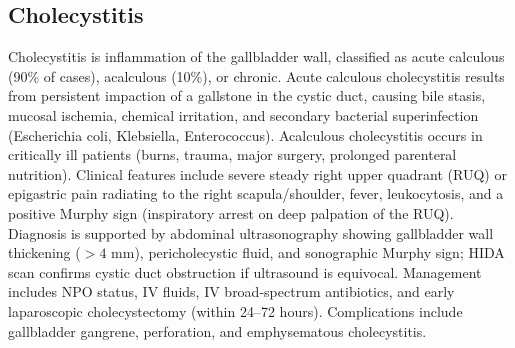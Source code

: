 



\label{sec:section:Gallbladder and Biliary Tract Diseases}

\subsection{Cholecystitis}
\label{sec:Cholecystitis}
Cholecystitis is inflammation of the gallbladder wall, classified as acute calculous (90\% of cases), acalculous (10\%), or chronic. Acute calculous cholecystitis results from persistent impaction of a gallstone in the cystic duct, causing bile stasis, mucosal ischemia, chemical irritation, and secondary bacterial superinfection (Escherichia coli, Klebsiella, Enterococcus). Acalculous cholecystitis occurs in critically ill patients (burns, trauma, major surgery, prolonged parenteral nutrition). Clinical features include severe steady right upper quadrant (RUQ) or epigastric pain radiating to the right scapula/shoulder, fever, leukocytosis, and a positive Murphy sign (inspiratory arrest on deep palpation of the RUQ). Diagnosis is supported by abdominal ultrasonography showing gallbladder wall thickening ($>4$ mm), pericholecystic fluid, and sonographic Murphy sign; HIDA scan confirms cystic duct obstruction if ultrasound is equivocal. Management includes NPO status, IV fluids, IV broad-spectrum antibiotics, and early laparoscopic cholecystectomy (within 24--72 hours). Complications include gallbladder gangrene, perforation, and emphysematous cholecystitis.


